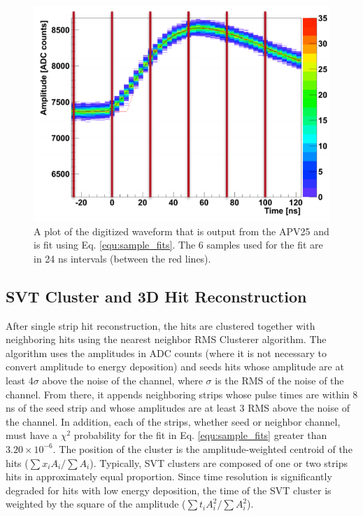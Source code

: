 \begin{figure}[t]
    \centering
    \includegraphics[width=.85\textwidth]{figs/recon/6samp.png}
    \caption{A plot of the digitized waveform that is output from the APV25 and is fit using Eq. \ref{equ:sample_fits}. The 6 samples used for the fit are in 24 ns intervals (between the red lines).
    }
    \label{fig:6samples}
\end{figure}

\clearpage

\subsection{SVT Cluster and 3D Hit Reconstruction}
After single strip hit reconstruction, the hits are clustered together with neighboring hits using the nearest neighbor RMS Clusterer algorithm. The algorithm uses the amplitudes in ADC counts (where it is not necessary to convert amplitude to energy deposition) and seeds hits whose amplitude are at least 4$\sigma$ above the noise of the channel, where $\sigma$ is the RMS of the noise of the channel. From there, it appends neighboring strips whose pulse times are within 8 ns of the seed strip and whose amplitudes are at least 3 RMS above the noise of the channel. In addition, each of the strips, whether seed or neighbor channel, must have a $\chi^2$ probability for the fit in Eq. \ref{equ:sample_fits} greater than $3.20 \times 10^{-6}$.  %
The position of the cluster is the amplitude-weighted centroid of the hits ($\sum x_i A_i/\sum A_i$). Typically, SVT clusters are composed of one or two strips hits in approximately equal proportion. Since time resolution is significantly degraded for hits with low energy deposition, the time of the SVT cluster is weighted by the square of the amplitude ($\sum t_i A_i^2/\sum A_i^2$).

